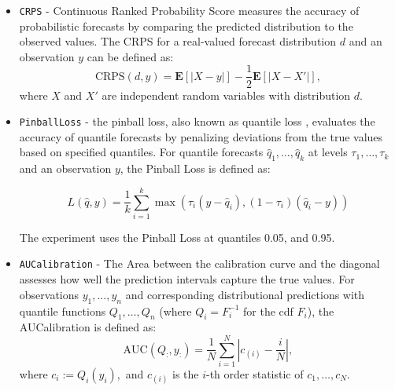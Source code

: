 \begin{itemize}

    \item \texttt{CRPS} - Continuous Ranked Probability Score \citep{matheson1976} measures the accuracy of probabilistic forecasts by comparing the predicted distribution to the observed values. The CRPS for a real-valued forecast distribution $d$ and an observation $y$ can be defined as:
    \[
    \text{CRPS}(d, y) = \mathbf{E} \left[ \left| X - y \right| \right] - \frac{1}{2} \mathbf{E} \left[ \left| X - X' \right| \right],
    \]
    where $X$ and $X'$ are independent random variables with distribution $d$.

    \item \texttt{PinballLoss} - the pinball loss, also known as quantile loss \citep{pinball_loss}, evaluates the accuracy of quantile forecasts by penalizing deviations from the true values based on specified quantiles.
    For quantile forecasts $\hat{q}_1, \dots, \hat{q}_k$ at levels $\tau_1, \dots, \tau_k$ and an observation $y$, the Pinball Loss is defined as:

    \begin{equation}
    L(\hat{q}, y) = \frac{1}{k} \sum_{i=1}^k \max \left(\tau_i (y - \hat{q}_i), (1 - \tau_i) (\hat{q}_i - y)\right)
    \end{equation}

    The experiment uses the Pinball Loss at quantiles 0.05, and 0.95.

    \item \texttt{AUCalibration} - The Area between the calibration curve and the diagonal assesses how well the prediction intervals capture the true values. For observations $y_1, \dots, y_n$ and corresponding distributional predictions with quantile functions $Q_1, \dots, Q_n$ (where $Q_i = F^{-1}_i$ for the cdf $F_i$), the AUCalibration is defined as:
    \begin{equation}
    \text{AUC} (Q_:, y_:) = \frac{1}{N} \sum_{i=1}^N \left| c_{(i)} - \frac{i}{N}\right|,
    \end{equation}
    where $c_i := Q_i(y_i),$ and $c_{(i)}$ is the $i$-th order statistic of $c_1, \dots, c_N$.


\end{itemize}
